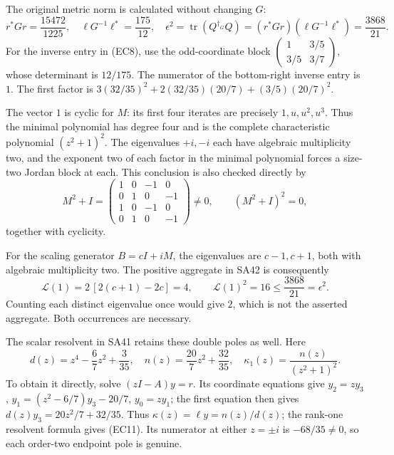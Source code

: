 \documentclass[11pt]{article}
\newcommand{\tr}{\operatorname{tr}}
\begin{document}
The original metric norm is calculated without changing \(G\):
\begin{equation}
 r^*Gr=\frac{15472}{1225},\quad
 \ell G^{-1}\ell^*=\frac{175}{12},\quad
 \epsilon^2=\tr(Q^{\dagger_G}Q)
     =(r^*Gr)(\ell G^{-1}\ell^*)=\frac{3868}{21}.
 \tag{EC8}
\end{equation}
For the inverse entry in (EC8), use the odd-coordinate block
\(\left(\begin{smallmatrix}1&3/5\\3/5&3/7\end{smallmatrix}\right)\),
whose determinant is \(12/175\). The numerator of the bottom-right
inverse entry is \(1\). The first factor is
\(3(32/35)^2+2(32/35)(20/7)+(3/5)(20/7)^2\).

The vector \(1\) is cyclic for \(M\): its first four iterates
are precisely \(1,u,u^2,u^3\). Thus the minimal polynomial has
degree four and is the complete characteristic polynomial
\((z^2+1)^2\). The eigenvalues \(+i,-i\) each have algebraic
multiplicity two, and the exponent two of each factor in the
minimal polynomial forces a size-two Jordan block at each.
This conclusion is also checked directly by
\begin{equation}
 M^2+I=
 \begin{pmatrix}
 1&0&-1&0\\0&1&0&-1\\1&0&-1&0\\0&1&0&-1
 \end{pmatrix}\ne0,\qquad (M^2+I)^2=0,
 \tag{EC9}
\end{equation}
together with cyclicity.

For the scaling generator \(B=cI+iM\), the eigenvalues are
\(c-1,c+1\), both with algebraic multiplicity two. The
positive aggregate in SA42 is consequently
\begin{equation}
 \mathcal L(1)=2\,[2(c+1)-2c]=4,\qquad
 \mathcal L(1)^2=16\le\frac{3868}{21}=\epsilon^2 .
 \tag{EC10}
\end{equation}
Counting each distinct eigenvalue once would give \(2\), which is
not the asserted aggregate. Both occurrences are necessary.

The scalar resolvent in SA41 retains these double poles as well.
Here
\begin{equation}
 d(z)=z^4-\frac67z^2+\frac3{35},\quad
 n(z)=\frac{20}{7}z^2+\frac{32}{35},\quad
 \kappa_1(z)=\frac{n(z)}{(z^2+1)^2}.
 \tag{EC11}
\end{equation}
To obtain it directly, solve \((zI-A)y=r\). Its coordinate
equations give \(y_2=zy_3\),
\(y_1=(z^2-6/7)y_3-20/7\), \(y_0=zy_1\);
the first equation then gives
\(d(z)y_3=20z^2/7+32/35\).
Thus \(\kappa(z)=\ell y=n(z)/d(z)\);
the rank-one resolvent formula gives (EC11).
Its numerator at either \(z=\pm i\) is \(-68/35\ne0\), so
each order-two endpoint pole is genuine.
\end{document}
